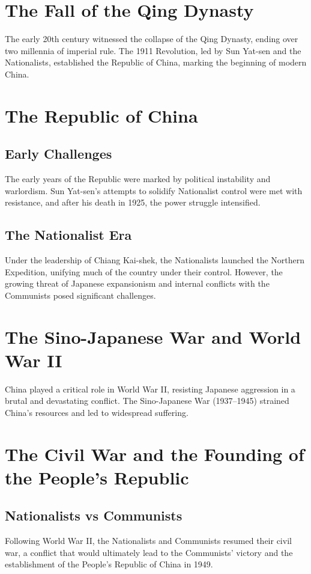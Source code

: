 \documentclass{book}
\begin{document}
\section{The Fall of the Qing Dynasty}
\label{sec:fall-qing-dynasty}
The early 20th century witnessed the collapse of the Qing Dynasty, ending over two millennia of imperial rule. The 1911 Revolution, led by Sun Yat-sen and the Nationalists, established the Republic of China, marking the beginning of modern China.

\section{The Republic of China}
\label{sec:republic-china}
\subsection{Early Challenges}
The early years of the Republic were marked by political instability and warlordism. Sun Yat-sen's attempts to solidify Nationalist control were met with resistance, and after his death in 1925, the power struggle intensified.

\subsection{The Nationalist Era}
Under the leadership of Chiang Kai-shek, the Nationalists launched the Northern Expedition, unifying much of the country under their control. However, the growing threat of Japanese expansionism and internal conflicts with the Communists posed significant challenges.

\section{The Sino-Japanese War and World War II}
\label{sec:sino-japanese-war}
China played a critical role in World War II, resisting Japanese aggression in a brutal and devastating conflict. The Sino-Japanese War (1937–1945) strained China's resources and led to widespread suffering.

\section{The Civil War and the Founding of the People's Republic}
\label{sec:civil-war-prc}
\subsection{Nationalists vs Communists}
Following World War II, the Nationalists and Communists resumed their civil war, a conflict that would ultimately lead to the Communists' victory and the establishment of the People's Republic of China in 1949.
\end{document}

